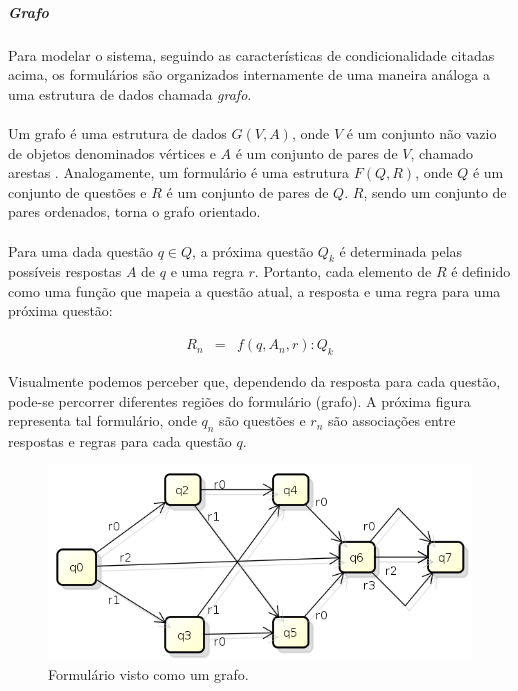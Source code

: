 \documentclass[11pt]{article}
\begin{document}
        \subparagraph{Grafo}
        
        \paragraph{}
        
        Para modelar o sistema, seguindo as características de condicionalidade
        citadas acima, os formulários são organizados internamente de uma maneira
        análoga a uma estrutura de dados chamada {\em grafo}. 
        
        \paragraph{}
        
        Um grafo é uma estrutura de dados $G(V,A)$, onde $V$ é um 
        conjunto não vazio de objetos 
        denominados vértices e $A$ é um conjunto de pares de $V$, 
        chamado arestas \cite{graphTenenbaum,graphMarcos}. Analogamente, 
        um formulário é uma estrutura $F(Q, R)$, onde $Q$ é um conjunto
        de questões e $R$ é um conjunto de pares de $Q$. $R$, sendo um conjunto de 
        pares ordenados, torna o grafo orientado.
        
        \paragraph{}
        
        Para uma dada questão $q \in Q$, a próxima questão $Q_k$ é determinada 
        pelas possíveis respostas $A$ de $q$ e uma regra $r$. Portanto, cada elemento
        de $R$ é definido como uma função que mapeia a questão atual, a 
        resposta e uma regra para uma próxima questão: 
        
        \begin{eqnarray}
          R_n &=& f(q, A_n, r) : Q_k
        \end{eqnarray}
        
        Visualmente podemos perceber que, dependendo da resposta para 
        cada questão, pode-se percorrer diferentes regiões do formulário
        (grafo). A próxima figura representa tal formulário, onde $q_n$ são questões e $r_n$ são associações entre respostas 
        e regras para cada questão $q$.
        
        \begin{figure}[h!]
          \centering
          \includegraphics[width=.9\textwidth]{graph.png}
          \caption{Formulário visto como um grafo.}
        \end{figure}
          
\end{document}
